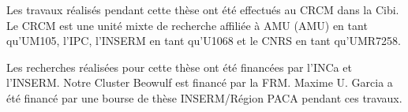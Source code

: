 \thispagestyle{empty}
\noindent\textsf{Les travaux réalisés pendant cette thèse ont été effectués au \ac{CRCM} dans la \ac{Cibi}.\\Le \ac{CRCM} est une unité mixte de recherche affiliée à \acl{AMU} (\acs{AMU}) en tant qu'UM105, l'\ac{IPC}, l'\ac{INSERM} en tant qu'U1068 et le \ac{CNRS} en tant qu'UMR7258.}
\vspace{.7cm}

\begin{center}
    \def\svgwidth{12cm}
\end{center}

\vspace{.7cm}
\noindent\textsf{Les recherches réalisées pour cette thèse ont été financées par l'\ac{INCa} et l'\ac{INSERM}. Notre Cluster Beowulf est financé par la \ac{FRM}. Maxime U. Garcia a été financé par une bourse de thèse \ac{INSERM}/Région \ac{PACA} pendant ces travaux.}